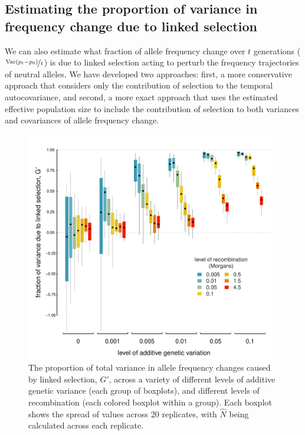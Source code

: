 \documentclass[11pt]{article}
\DeclareMathOperator{\var}{Var}
\begin{document}
\subsection{Estimating the proportion of variance in frequency change due to linked selection}

We can also estimate what fraction of allele frequency change over $t$
generations ($\nicefrac{\var(p_t - p_0)}{t}$) is due to linked selection acting
to perturb the frequency trajectories of neutral alleles. We have developed two
approaches: first, a more conservative approach that considers only the
contribution of selection to the temporal autocovariance, and second, a more
exact approach that uses the estimated effective population size to include the
contribution of selection to both variances and covariances of allele frequency
change.

\begin{figure}
  \centering
  \includegraphics{./images/estimate-gp.pdf} 

  \caption{The proportion of total variance in allele frequency changes caused
    by linked selection, $G'$, across a variety of different levels of additive
    genetic variance (each group of boxplots), and different levels of
    recombination (each colored boxplot within a group). Each boxplot shows the
  spread of values across 20 replicates, with $\widehat{N}$ being calculated
across each replicate.} 

  \label{fig:est-g}
\end{figure}
\end{document}

